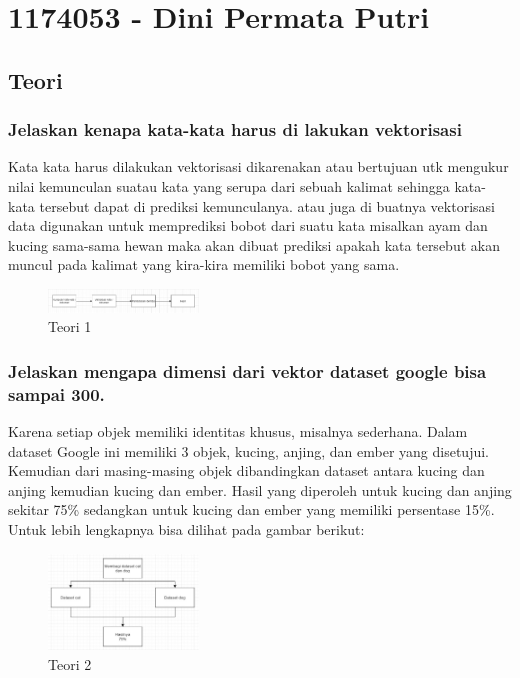 \section{1174053 - Dini Permata Putri}
\subsection{Teori}
\subsubsection{Jelaskan kenapa kata-kata harus di lakukan vektorisasi}

\hfill\break
Kata kata harus dilakukan vektorisasi dikarenakan atau bertujuan utk mengukur nilai kemunculan suatau kata yang serupa dari sebuah kalimat sehingga kata-kata tersebut dapat di prediksi kemunculanya. atau juga di buatnya vektorisasi data digunakan untuk memprediksi bobot dari suatu kata misalkan ayam dan kucing sama-sama hewan maka akan dibuat prediksi apakah kata tersebut akan muncul pada kalimat yang kira-kira memiliki bobot yang sama.
\begin{figure}[H]
\includegraphics[width=4cm]{figures/1174053/5/1.jpg}
\centering
\caption{Teori 1}
\end{figure}

\subsubsection{Jelaskan mengapa dimensi dari vektor dataset google bisa sampai 300.}

\hfill\break
Karena setiap objek memiliki identitas khusus, misalnya sederhana. Dalam dataset Google ini memiliki 3 objek, kucing, anjing, dan ember yang disetujui. Kemudian dari masing-masing objek dibandingkan dataset antara kucing dan anjing kemudian kucing dan ember. Hasil yang diperoleh untuk kucing dan anjing sekitar 75\% sedangkan untuk kucing dan ember yang memiliki persentase 15\%. Untuk lebih lengkapnya bisa dilihat pada gambar berikut: 
\begin{figure}[H]
\includegraphics[width=4cm]{figures/1174053/5/2.jpg}
\centering
\caption{Teori 2}
\end{figure}

